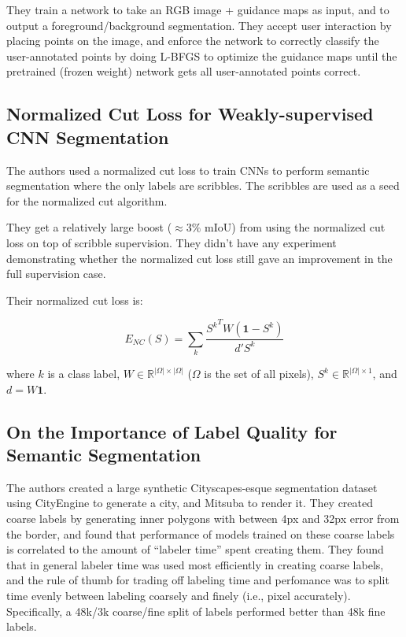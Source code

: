 \documentclass[a4paper, 12pt]{article}
\begin{document}
They train a network to take an RGB image + guidance maps as input, and to
output a foreground/background segmentation. They accept user interaction by
placing points on the image, and enforce the network to correctly classify the
user-annotated points by doing L-BFGS to optimize the guidance maps until the
pretrained (frozen weight) network gets all user-annotated points correct.


\subsection{Normalized Cut Loss for Weakly-supervised CNN
            Segmentation~\cite{tang2018normalized}}

The authors used a normalized cut loss to train CNNs to perform semantic
segmentation where the only labels are scribbles. The scribbles are used as a
seed for the normalized cut algorithm.

They get a relatively large boost ($\approx 3\%$ mIoU) from using the
normalized cut loss on top of scribble supervision. They didn't have any
experiment demonstrating whether the normalized cut loss still gave an
improvement in the full supervision case.

Their normalized cut loss is:

\begin{equation}
        E_{NC}(S) = \sum_k \frac{{S^k}^T W (\mathbf{1} - S^k)}{d' S^k}
\end{equation}

where $k$ is a class label, $W \in \mathbb{R}^{|\Omega| \times |\Omega|}$
($\Omega$ is the set of all pixels), $S^k \in \mathbb{R}^{|\Omega| \times 1}$,
and~$d = W\mathbf{1}$.


\subsection{On the Importance of Label Quality for Semantic
            Segmentation~\cite{Zlateski_2018_CVPR}}

The authors created a large synthetic Cityscapes-esque segmentation dataset
using CityEngine to generate a city, and Mitsuba to render it. They created
coarse labels by generating inner polygons with between 4px and 32px error from
the border, and found that performance of models trained on these coarse labels
is correlated to the amount of ``labeler time'' spent creating them. They found
that in general labeler time was used most efficiently in creating coarse
labels, and the rule of thumb for trading off labeling time and perfomance was
to split time evenly between labeling coarsely and finely (i.e., pixel
accurately). Specifically, a 48k/3k coarse/fine split of labels performed
better than 48k fine labels.
\end{document}
